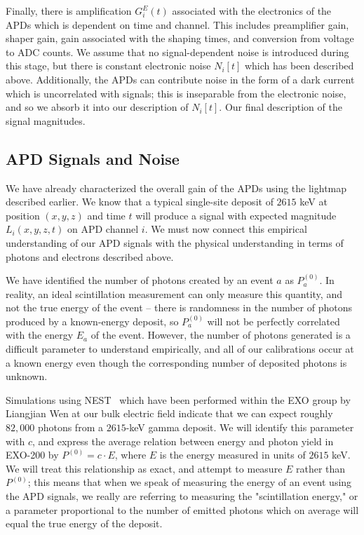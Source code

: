 Finally, there is amplification $G^{E}_i(t)$ associated with the electronics of the APDs which is dependent on time and channel.  This includes preamplifier gain, shaper gain, gain associated with the shaping times, and conversion from voltage to ADC counts.  We assume that no signal-dependent noise is introduced during this stage, but there is constant electronic noise $N_i[t]$ which has been described above.  Additionally, the APDs can contribute noise in the form of a dark current which is uncorrelated with signals; this is inseparable from the electronic noise, and so we absorb it into our description of $N_i[t]$.  Our final description of the signal magnitudes.

\subsection{APD Signals and Noise}

We have already characterized the overall gain of the APDs using the lightmap described earlier.  We know that a typical single-site deposit of $2615$ keV at position $(x,y,z)$ and time $t$ will produce a signal with expected magnitude $L_i(x,y,z,t)$ on APD channel $i$.  We must now connect this empirical understanding of our APD signals with the physical understanding in terms of photons and electrons described above.

We have identified the number of photons created by an event $a$ as $P^{(0)}_a$.  In reality, an ideal scintillation measurement can only measure this quantity, and not the true energy of the event -- there is randomness in the number of photons produced by a known-energy deposit, so $P^{(0)}_a$ will not be perfectly correlated with the energy $E_a$ of the event.  However, the number of photons generated is a difficult parameter to understand empirically, and all of our calibrations occur at a known energy even though the corresponding number of deposited photons is unknown.

Simulations using NEST~\cite{NESTpaper} which have been performed within the EXO group by Liangjian Wen at our bulk electric field indicate that we can expect roughly $82,000$ photons from a $2615$-keV gamma deposit.  We will identify this parameter with $c$, and express the average relation between energy and photon yield in EXO-200 by
$P^{(0)} = c \cdot E$,
where $E$ is the energy measured in units of $2615$ keV.  We will treat this relationship as exact, and attempt to measure $E$ rather than $P^{(0)}$; this means that when we speak of measuring the energy of an event using the APD signals, we really are referring to measuring the "scintillation energy," or a parameter proportional to the number of emitted photons which on average will equal the true energy of the deposit.

